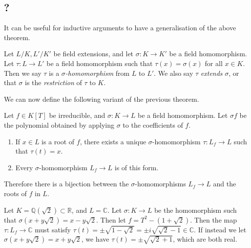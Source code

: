 \subsection{?}
It can be useful for inductive arguments to have a generalisation of the above theorem.
\begin{definition}
	Let \( L / K, L' / K' \) be field extensions, and let \( \sigma \colon K \to K' \) be a field homomorphism.
	Let \( \tau \colon L \to L' \) be a field homomorphism such that \( \tau(x) = \sigma(x) \) for all \( x \in K \).
	Then we say \( \tau \) is a \emph{\( \sigma \)-homomorphism} from \( L \) to \( L' \).
	We also say \( \tau \) \emph{extends} \( \sigma \), or that \( \sigma \) is the \emph{restriction} of \( \tau \) to \( K \).
\end{definition}
We can now define the following variant of the previous theorem.
\begin{theorem}
	Let \( f \in K[T] \) be irreducible, and \( \sigma \colon K \to L \) be a field homomorphism.
	Let \( \sigma f \) be the polynomial obtained by applying \( \sigma \) to the coefficients of \( f \).
	\begin{enumerate}
		\item If \( x \in L \) is a root of \( f \), there exists a unique \( \sigma \)-homomorphism \( \tau \colon L_f \to L \) such that \( \tau(t) = x \).
		\item Every \( \sigma \)-homomorphism \( L_f \to L \) is of this form.
	\end{enumerate}
	Therefore there is a bijection between the \( \sigma \)-homomorphisms \( L_f \to L \) and the roots of \( f \) in \( L \).
\end{theorem}
\begin{example}
	Let \( K = \mathbb Q(\sqrt 2) \subset \mathbb R \), and \( L = \mathbb C \).
	Let \( \sigma \colon K \to L \) be the homomorphism such that \( \sigma(x+y\sqrt 2) = x-y\sqrt 2 \).
	Then let \( f = T^2 - (1 + \sqrt 2) \).
	Then the map \( \tau \colon L_f \to \mathbb C \) must satisfy \( \tau(t) = \pm \sqrt{1 - \sqrt 2} = \pm i \sqrt{\sqrt 2 - 1} \in \mathbb C \).
	If instead we let \( \sigma(x+y\sqrt 2) = x+y\sqrt 2 \), we have \( \tau(t) = \pm\sqrt{\sqrt 2 + 1} \), which are both real.
\end{example}

